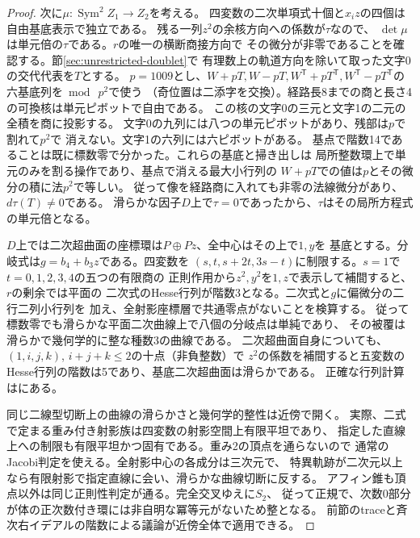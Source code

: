 \begin{proof}
次に$\mu:\operatorname{Sym}^2 Z_1\to Z_2$を考える。
四変数の二次単項式十個と$x_i z$の四個は自由基底表示で独立である。
残る一列$z^2$の余核方向への係数が$\tau$なので、
$\det\mu$は単元倍の$\tau$である。$r$の唯一の横断商接方向で
その微分が非零であることを確認する。節\ref{sec:unrestricted-doublet}で
有理数上の軌道方向を除いて取った文字0の交代代表を$T$とする。
$p=1009$とし、$W+pT,W-pT,W^{\mathsf T}+pT^{\mathsf T},
W^{\mathsf T}-pT^{\mathsf T}$の六基底列を$\bmod\ p^2$で使う
（奇位置は二添字を交換）。経路長8までの商と長さ4の可換核は単元ピボットで自由である。
この核の文字0の三元と文字1の二元の全積を商に投影する。
文字0の九列には八つの単元ピボットがあり、残部は$p$で割れて$p^2$で
消えない。文字1の六列には六ピボットがある。
基点で階数14であることは既に標数零で分かった。これらの基底と掃き出しは
局所整数環上で単元のみを割る操作であり、基点で消える最大小行列の
$W+pT$での値は$p$とその微分の積に法$p^2$で等しい。
従って像を経路商に入れても非零の法線微分があり、$d\tau(T)\ne0$である。
滑らかな因子$D$上で$\tau=0$であったから、$\tau$はその局所方程式の単元倍となる。

$D$上では二次超曲面の座標環は$P\oplus Pz$、全中心はその上で$1,y$を
基底とする。分岐式は$g=b_4+b_3z$である。四変数を
$(s,t,s+2t,3s-t)$に制限する。$s=1$で$t=0,1,2,3,4$の五つの有限商の
正則作用から$z^2,y^2$を$1,z$で表示して補間すると、$r$の剰余では平面の
二次式のHesse行列が階数3となる。二次式と$g$に偏微分の二行二列小行列を
加え、全射影座標層で共通零点がないことを検算する。
従って標数零でも滑らかな平面二次曲線上で八個の分岐点は単純であり、
その被覆は滑らかで幾何学的に整な種数3の曲線である。
二次超曲面自身についても、$(1,i,j,k)$, $i+j+k\le2$の十点（非負整数）で
$z^2$の係数を補間すると五変数のHesse行列の階数は5であり、基底二次超曲面は滑らかである。
正確な行列計算はにある。

同じ二線型切断上の曲線の滑らかさと幾何学的整性は近傍で開く。
実際、二式で定まる重み付き射影族は四変数の射影空間上有限平坦であり、
指定した直線上への制限も有限平坦かつ固有である。重み2の頂点を通らないので
通常のJacobi判定を使える。全射影中心の各成分は三次元で、
特異軌跡が二次元以上なら有限射影で指定直線に会い、滑らかな曲線切断に反する。
アフィン錐も頂点以外は同じ正則性判定が通る。完全交叉ゆえに$S_2$、
従って正規で、次数0部分が体の正次数付き環には非自明な冪等元がないため整となる。
前節のtraceと斉次右イデアルの階数による議論が近傍全体で適用できる。
\end{proof}
